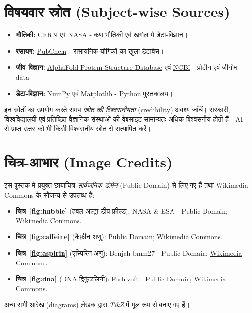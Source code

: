 \section*{विषयवार स्रोत (Subject-wise Sources)}
\begin{itemize}[leftmargin=1.4em]
  \item \textbf{भौतिकी:} \href{https://home.cern/}{CERN} एवं
        \href{https://www.nasa.gov/}{NASA} - कण भौतिकी एवं खगोल में डेटा-विज्ञान।
  \item \textbf{रसायन:} \href{https://pubchem.ncbi.nlm.nih.gov/}{PubChem} -
        रासायनिक यौगिकों का खुला डेटाबेस।
  \item \textbf{जीव विज्ञान:} \href{https://alphafold.ebi.ac.uk/}{AlphaFold
        Protein Structure Database} एवं
        \href{https://www.ncbi.nlm.nih.gov/}{NCBI} - प्रोटीन एवं जीनोम data।
  \item \textbf{डेटा-विज्ञान:} \href{https://numpy.org/}{NumPy} एवं
        \href{https://matplotlib.org/}{Matplotlib} - Python पुस्तकालय।
\end{itemize}

\begin{padhe}
इन स्रोतों का उपयोग करते समय \emph{स्रोत की विश्वसनीयता} (credibility) अवश्य जाँचें।
सरकारी, विश्वविद्यालयी एवं प्रतिष्ठित वैज्ञानिक संस्थाओं की वेबसाइट सामान्यतः अधिक
विश्वसनीय होती हैं। AI से प्राप्त उत्तर को भी किसी विश्वसनीय स्रोत से सत्यापित करें।
\end{padhe}

\section*{चित्र-आभार (Image Credits)}
\noindent इस पुस्तक में प्रयुक्त छायाचित्र \emph{सार्वजनिक डोमेन} (Public Domain) से लिए
गए हैं तथा Wikimedia Commons के सौजन्य से उपलब्ध हैं:
\begin{itemize}[leftmargin=1.4em]
  \item \textbf{चित्र~\ref{fig:hubble}} (हबल अल्ट्रा डीप फ़ील्ड): NASA \& ESA -
        Public Domain;
        \href{https://commons.wikimedia.org/wiki/File:Hubble_ultra_deep_field.jpg}{Wikimedia Commons}.
  \item \textbf{चित्र~\ref{fig:caffeine}} (कैफ़ीन अणु): Public Domain;
        \href{https://commons.wikimedia.org/wiki/File:Caffeine-3D-balls.png}{Wikimedia Commons}.
  \item \textbf{चित्र~\ref{fig:aspirin}} (एस्पिरिन अणु): Benjah-bmm27 - Public
        Domain; \href{https://commons.wikimedia.org/wiki/File:Aspirin-3D-balls.png}{Wikimedia Commons}.
  \item \textbf{चित्र~\ref{fig:dna}} (DNA द्विकुंडलिनी): Forluvoft - Public
        Domain; \href{https://commons.wikimedia.org/wiki/File:DNA_simple2.svg}{Wikimedia Commons}.
\end{itemize}
\noindent अन्य सभी आरेख (diagrams) लेखक द्वारा \emph{TikZ} में मूल रूप से बनाए गए हैं।

